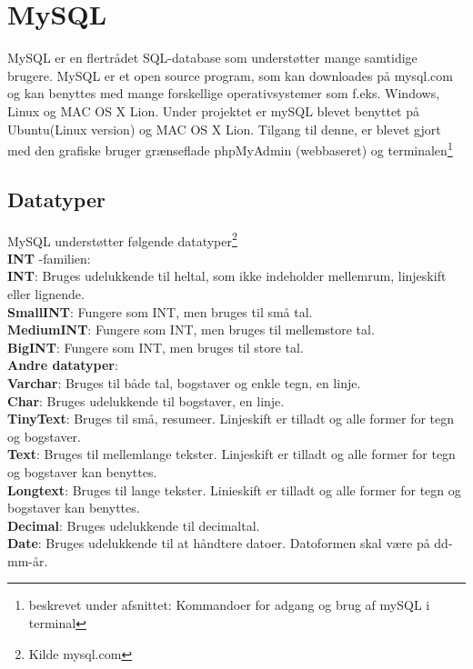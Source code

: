 \section*{MySQL}
MySQL er en flertrådet SQL-database som understøtter mange samtidige brugere. MySQL er et open source program, som kan downloades på mysql.com og kan benyttes med mange forskellige operativsystemer som f.eks. Windows, Linux og MAC OS X Lion.
Under projektet er mySQL blevet benyttet på Ubuntu(Linux version) og MAC OS X Lion. Tilgang til denne, er blevet gjort med den grafiske bruger grænseflade phpMyAdmin (webbaseret) og terminalen\footnote{beskrevet under afsnittet: Kommandoer for adgang og brug af mySQL i terminal}

\subsection*{Datatyper}
MySQL understøtter følgende datatyper\footnote{Kilde mysql.com} \\
\textbf{INT} -familien:\\
\textbf{INT}: Bruges udelukkende til heltal, som ikke indeholder mellemrum, linjeskift eller lignende.\\
\textbf{SmallINT}: Fungere som INT, men bruges til små tal.\\
\textbf{MediumINT}: Fungere som INT, men bruges til mellemstore tal.\\
\textbf{BigINT}: Fungere som INT, men bruges til store tal.\\

\textbf{Andre datatyper}:\\
\textbf{Varchar}: Bruges til både tal, bogstaver og enkle tegn, en linje.\\
\textbf{Char}: Bruges udelukkende til bogstaver, en linje.\\
\textbf{TinyText}: Bruges til små, resumeer. Linjeskift er tilladt og alle former for tegn og bogstaver.\\
\textbf{Text}: Bruges til mellemlange tekster. Linjeskift er tilladt og alle former for tegn og bogstaver kan benyttes.\\
\textbf{Longtext}: Bruges til lange tekster. Linieskift er tilladt og alle former for tegn og bogstaver kan benyttes.\\
\textbf{Decimal}: Bruges udelukkende til decimaltal.\\
\textbf{Date}: Bruges udelukkende til at håndtere datoer. Datoformen skal være på dd-mm-år.\\

